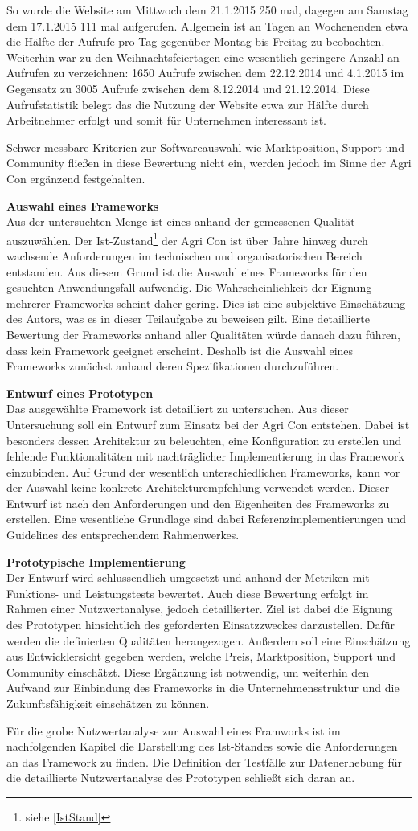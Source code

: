 So wurde die Website am Mittwoch dem 21.1.2015 250 mal, dagegen am Samstag dem 17.1.2015 111 mal aufgerufen.
Allgemein ist an Tagen an Wochenenden etwa die Hälfte der Aufrufe pro Tag gegenüber Montag bis Freitag zu beobachten.
Weiterhin war zu den Weihnachtsfeiertagen eine wesentlich geringere Anzahl an Aufrufen zu verzeichnen: 1650 Aufrufe zwischen dem 22.12.2014 und 4.1.2015 im Gegensatz zu 3005 Aufrufe zwischen dem 8.12.2014 und 21.12.2014.
Diese Aufrufstatistik belegt das die Nutzung der Website etwa zur Hälfte durch Arbeitnehmer erfolgt und somit für Unternehmen interessant ist.

Schwer messbare Kriterien zur Softwareauswahl wie Marktposition, Support und Community fließen in diese Bewertung nicht ein, werden jedoch im Sinne der Agri Con ergänzend festgehalten.

\textbf{Auswahl eines Frameworks}\\
Aus der untersuchten Menge ist eines anhand der gemessenen Qualität auszuwählen.
Der Ist-Zustand\footnote{siehe \ref{IstStand}} der Agri Con ist über Jahre hinweg durch wachsende  Anforderungen im technischen und organisatorischen Bereich entstanden.
Aus diesem Grund ist die Auswahl eines Frameworks für den gesuchten Anwendungsfall aufwendig.
Die Wahrscheinlichkeit der Eignung mehrerer Frameworks scheint daher gering.
Dies ist eine subjektive Einschätzung des Autors, was es in dieser Teilaufgabe zu beweisen gilt.
Eine detaillierte Bewertung der Frameworks anhand aller Qualitäten würde danach dazu führen, dass kein Framework geeignet erscheint.
Deshalb ist die Auswahl eines Frameworks zunächst anhand deren Spezifikationen durchzuführen.

\textbf{Entwurf eines Prototypen}\\
Das ausgewählte Framework ist detailliert zu untersuchen.
Aus dieser Untersuchung soll ein Entwurf zum Einsatz bei der Agri Con entstehen.
Dabei ist besonders dessen Architektur zu beleuchten, eine Konfiguration zu erstellen und fehlende Funktionalitäten mit nachträglicher Implementierung in das Framework einzubinden.
Auf Grund der wesentlich unterschiedlichen Frameworks, kann vor der Auswahl keine konkrete Architekturempfehlung verwendet werden. Dieser Entwurf ist nach den Anforderungen und den Eigenheiten des Frameworks zu erstellen. Eine wesentliche Grundlage sind dabei Referenzimplementierungen und Guidelines des entsprechendem Rahmenwerkes.

\textbf{Prototypische Implementierung}\\
Der Entwurf wird schlussendlich umgesetzt und anhand der Metriken mit Funktions- und Leistungstests bewertet.
Auch diese Bewertung erfolgt im Rahmen einer Nutzwertanalyse, jedoch detaillierter.
Ziel ist dabei die Eignung des Prototypen hinsichtlich des geforderten Einsatzzweckes darzustellen.
Dafür werden die definierten Qualitäten herangezogen.
Außerdem soll eine Einschätzung aus Entwicklersicht gegeben werden, welche Preis, Marktposition, Support und Community einschätzt.
Diese Ergänzung ist notwendig, um weiterhin den Aufwand zur Einbindung des Frameworks in die Unternehmensstruktur und die Zukunftsfähigkeit einschätzen zu können.

Für die grobe Nutzwertanalyse zur Auswahl eines Framworks ist im nachfolgenden Kapitel die Darstellung des Ist-Standes sowie die Anforderungen an das Framework zu finden.
Die Definition der Testfälle zur Datenerhebung für die detaillierte Nutzwertanalyse des Prototypen schließt sich daran an.